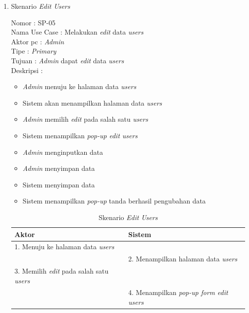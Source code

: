 \begin{enumerate}
\newpage
\item Skenario \textit{Edit Users}

Nomor \kern 3.6pc : SP-05 \\
Nama Use Case : Melakukan \textit{edit} data \textit{users} \\
Aktor  pc : \textit{Admin} \\
Tipe \kern 4.6pc : \textit{Primary} \\
Tujuan \kern 3.6pc : \textit{Admin} dapat \textit{edit} data \textit{users} \\
Deskripsi \kern 2.5pc : 

\begin{itemize}
	\item \textit{Admin} menuju ke halaman data \textit{users}
	\item Sistem akan menampilkan halaman data \textit{users}
	\item \textit{Admin} memilih \textit{edit} pada salah satu \textit{users}
	\item Sistem menampilkan \textit{pop-up edit users}
	\item \textit{Admin} menginputkan data
	\item \textit{Admin} menyimpan data
	\item Sistem menyimpan data
	\item Sistem menampilkan \textit{pop-up} tanda berhasil pengubahan data
	
\end{itemize}

\begin{table}
	\caption{Skenario \textit{Edit Users}}
	\centering
	\begin{tabular}{ | l | p{65mm} |}
		\hline 
		\textbf{Aktor} & \textbf{Sistem} \\
		\hline
		
		1.	Menuju ke halaman data \textit{users} &  \\
		
		\hline
		
		&  2.	Menampilkan halaman data \textit{users} \\
		
		\hline
		
		3. Memilih \textit{edit} pada salah satu \textit{users} & \\
		
		\hline
		
		& 4.	Menampilkan \textit{pop-up form edit users} \\
		

\end{tabular}
\end{table}
\end{enumerate}
